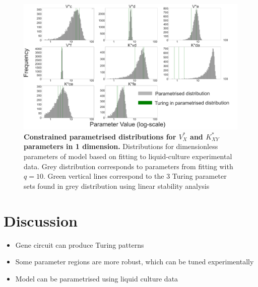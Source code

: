 \begin{figure}[H] %
    \centering
    \begin{adjustbox}{center}
        \includegraphics[width=1\textwidth]{chapters/Chapter 2/1d_distributions} %
    \end{adjustbox}
    \caption{\textbf{Constrained parametrised distributions for $V^*_X$ and $K^*_{XY}$ parameters in 1 dimension.}
    Distributions for dimensionless parameters of model based on fitting to liquid-culture experimental data.
    Grey distribution corresponds to parameters from fitting with $q=10$.
    Green vertical lines correspond to the 3 Turing parameter sets
    found in grey distribution using linear stability analysis }
    \label{fig:1d_distributions} %
\end{figure}

\section{Discussion}
\begin{itemize}
    \item Gene circuit can produce Turing patterns
    \item Some parameter regions are more robust, which can be tuned experimentally
    \item Model can be parametrised using liquid culture data
\end{itemize}

